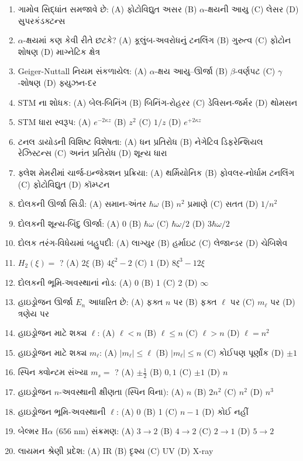 \begin{enumerate}[label=\textbf{\arabic*.}]
  \item ગામોવ સિદ્ધાંત સમજાવે છે: (A) ફોટોવિદ્યુત અસર (B) $\alpha$-ક્ષયની આયુ (C) લેસર (D) સુપરકંડક્ટન્સ
  \item $\alpha$-ક્ષયમાં કણ કેવી રીતે છટકે? (A) કૂલુંબ-અવરોધનું ટનલિંગ (B) ગુરુત્વ (C) ફોટોન શોષણ (D) માગ્નેટિક ક્ષેત્ર
  \item Geiger-Nuttall નિયમ સંકળાયેલ: (A) $\alpha$-ક્ષય આયુ–ઊર્જા (B) $\beta$-વર્ણપટ (C) $\gamma$-શોષણ (D) ફ્યુઝન-દર
  \item STM ના શોધક: (A) બેલ-બિનિંગ (B) બિનિંગ-રોહરર (C) ડેવિસન-જર્મર (D) થોમસન
  \item STM ધારા સ્વરૂપ: (A) $e^{-2\kappa z}$ (B) $z^{2}$ (C) $1/z$ (D) $e^{+2\kappa z}$
  \item ટનલ ડાયોડની વિશિષ્ટ વિશેષતા: (A) ધન પ્રતિરોધ (B) નેગેટિવ ડિફરેન્શિયલ રેઝિસ્ટન્સ (C) અનંત પ્રતિરોધ (D) શૂન્ય ધારા
  \item ફ્લેશ મેમરીમાં ચાર્જ-ઇન્જેક્શન પ્રક્રિયા: (A) થર્મિયોનિક (B) ફોવલર-નોર્ધામ ટનલિંગ (C) ફોટોવિદ્યુત (D) કૉમ્પ્ટન
  \item દોલકની ઊર્જા સિડી: (A) સમાન-અંતર $\hbar\omega$ (B) $n^{2}$ પ્રમાણે (C) સતત (D) $1/n^{2}$
  \item દોલકની શૂન્ય-બિંદુ ઊર્જા: (A) 0 (B) $\hbar\omega$ (C) $\hbar\omega/2$ (D) $3\hbar\omega/2$
  \item દોલક તરંગ-વિધેયમાં બહુપદી: (A) લાગ્યુર (B) હર્માઇટ (C) લેજાન્ડર (D) ચેબિશેવ
  \item $H_2(\xi)=$ ? (A) $2\xi$ (B) $4\xi^{2}-2$ (C) $1$ (D) $8\xi^{3}-12\xi$
  \item દોલકની ભૂમિ-અવસ્થાનાં નોડ: (A) 0 (B) 1 (C) 2 (D) $\infty$
  \item હાઇડ્રોજન ઊર્જા $E_n$ આધારિત છે: (A) ફક્ત $n$ પર (B) ફક્ત $\ell$ પર (C) $m_\ell$ પર (D) ત્રણેય પર
  \item હાઇડ્રોજન માટે શક્ય $\ell$: (A) $\ell<n$ (B) $\ell\le n$ (C) $\ell>n$ (D) $\ell=n^{2}$
  \item હાઇડ્રોજન માટે શક્ય $m_\ell$: (A) $|m_\ell|\le\ell$ (B) $|m_\ell|\le n$ (C) કોઈપણ પૂર્ણાંક (D) $\pm1$
  \item સ્પિન ક્વોન્ટમ સંખ્યા $m_s=$ ? (A) $\pm\tfrac12$ (B) $0,1$ (C) $\pm1$ (D) $n$
  \item હાઇડ્રોજન $n$-અવસ્થાની ક્ષીણતા (સ્પિન વિના): (A) $n$ (B) $2n^{2}$ (C) $n^{2}$ (D) $n^{3}$
  \item હાઇડ્રોજન ભૂમિ-અવસ્થાની $\ell$: (A) 0 (B) 1 (C) $n-1$ (D) કોઈ નહીં
  \item બેલ્મર H$\alpha$ ($656$ nm) સંક્રમણ: (A) $3\to2$ (B) $4\to2$ (C) $2\to1$ (D) $5\to2$
  \item લાયમન શ્રેણી પ્રદેશ: (A) IR (B) દૃશ્ય (C) UV (D) X-ray

\end{enumerate}
